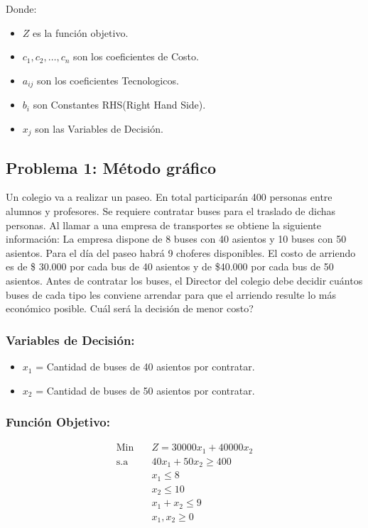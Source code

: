 \documentclass{templateNote}
\begin{document}
Donde:
\begin{itemize}
    \item $Z$ es la función objetivo.
    \item $c_1, c_2, \ldots, c_n$ son los coeficientes de Costo.
    \item $a_{ij}$ son los coeficientes Tecnologicos.
    \item $b_i$ son Constantes RHS(Right Hand Side).
    \item $x_j$ son las Variables de Decisión.
\end{itemize}

\newpage
\subsection*{Problema 1: Método gráfico}
Un colegio va a realizar un paseo. En total participarán 400 personas entre alumnos y profesores. Se requiere contratar buses para el traslado de dichas personas. Al llamar a una empresa de transportes se obtiene la siguiente información: La empresa dispone de 8 buses con 40 asientos y 10 buses con 50 asientos. Para el día del paseo habrá 9 choferes disponibles. El costo de arriendo es de \$ 30.000 por cada bus de 40 asientos y de \$40.000 por cada bus de 50 asientos. Antes de contratar los buses, el Director del colegio debe decidir cuántos buses de cada tipo les conviene arrendar para que el arriendo resulte lo más económico posible. Cuál será la decisión de menor costo?

\subsubsection*{Variables de Decisión:}
\begin{itemize}
    \item $x_1$ = Cantidad de buses de 40 asientos por contratar.
    \item $x_2$ = Cantidad de buses de 50 asientos por contratar.
\end{itemize}

\subsubsection*{Función Objetivo:}
\begin{equation*}
    \begin{aligned}
        \text{Min} \quad & Z = 30000x_1 + 40000x_2 \\
        \text{s.a} \quad & 40x_1 + 50x_2 \geq 400 \\
        & x_1 \leq 8 \\
        & x_2 \leq 10 \\
        & x_1 + x_2 \leq 9 \\
        & x_1, x_2 \geq 0
    \end{aligned}
\end{equation*}
\end{document}
